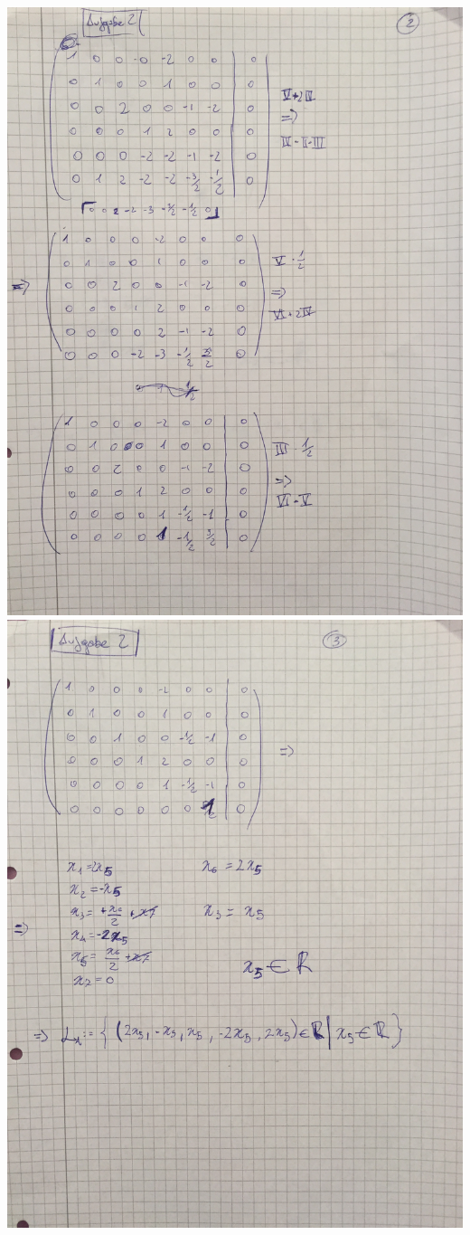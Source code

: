 \documentclass[10pt,a4paper]{article}
\begin{document}
\includegraphics[scale=0.2, angle=270]{A2_2.jpg}
\newpage
\includegraphics[scale=0.2, angle=270]{A2_3.jpg} 
\newpage
\end{document}
